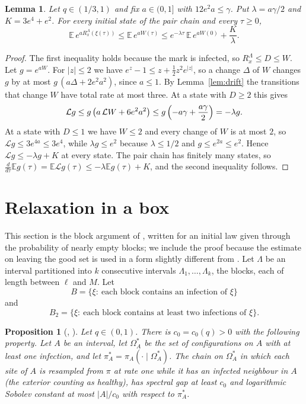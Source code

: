 \documentclass[11pt]{amsart}
\newtheorem{lemma}[theorem]{Lemma}
\newtheorem{proposition}[theorem]{Proposition}
\theoremstyle{definition}
\theoremstyle{remark}
\newcommand{\E}{\mathbb{E}}
\newcommand{\cL}{\mathcal{L}}
\begin{document}
\begin{lemma}\label{lem:moment}
Let $q\in(1/3,1)$ and fix $a\in(0,1]$ with $12e^2a\le\gamma$. Put $\lambda=a\gamma/2$ and $K=3e^4+e^2$. For every
initial state of the pair chain and every $\tau\ge0$,
\begin{equation}\label{eq:moment}
\E\,e^{aR^\Lambda_x(\xi(\tau))}\le\E\,e^{aW(\tau)}\le e^{-\lambda\tau}\,\E\,e^{aW(0)}+\frac K\lambda .
\end{equation}
\end{lemma}

\begin{proof}
The first inequality holds because the mark is infected, so $R^\Lambda_x\le D\le W$. Let $g=e^{aW}$. For $|z|\le2$ we have
$e^z-1\le z+\tfrac12z^2e^{|z|}$, so a change $\Delta$ of $W$ changes $g$ by at most $g\,(a\Delta+2e^2a^2)$, since $a\le1$.
By Lemma~\ref{lem:drift} the transitions that change $W$ have total rate at most three. At a state with $D\ge2$ this gives
\[
\cL g\le g\,\bigl(a\,\cL W+6e^2a^2\bigr)\le g\,\Bigl(-a\gamma+\frac{a\gamma}2\Bigr)=-\lambda g.
\]
At a state with $D\le1$ we have $W\le2$ and every change of $W$ is at most $2$, so $\cL g\le3e^{4a}\le3e^4$, while
$\lambda g\le e^2$ because $\lambda\le1/2$ and $g\le e^{2a}\le e^2$. Hence $\cL g\le-\lambda g+K$ at every state. The pair chain has finitely many
states, so $\frac{d}{d\tau}\E g(\tau)=\E\cL g(\tau)\le-\lambda\E g(\tau)+K$, and the second inequality follows.
\end{proof}

\section{Relaxation in a box}\label{sec:box}

This section is the block argument of \cite[Section~3]{BCMRT13}, written for an initial law given through the probability
of nearly empty blocks; we include the proof because the estimate on leaving the good set is used in a form slightly
different from \cite[Proposition~3.1]{BCMRT13}. Let $\Lambda$ be an interval partitioned into $k$ consecutive intervals
$\Lambda_1,\dots,\Lambda_k$, the blocks, each of length between $\ell$ and $M$. Let
\[
B=\{\xi:\ \text{each block contains an infection of }\xi\}
\]
and
\[
B_2=\{\xi:\ \text{each block contains at least two infections of }\xi\}.
\]

\begin{proposition}[{\cite[Proposition~3.4]{BCMRT13}, \cite[Theorem~6.4]{CMRT09}}]\label{prop:gap}
Let $q\in(0,1)$. There is $c_0=c_0(q)>0$ with the following property. Let $A$ be an interval, let $\Omega_A^*$ be the set
of configurations on $A$ with at least one infection, and let $\pi_A^*=\pi_A(\cdot\mid\Omega_A^*)$. The chain on
$\Omega_A^*$ in which each site of $A$ is resampled from $\pi$ at rate one while it has an infected neighbour in $A$ (the
exterior counting as healthy), has spectral gap at least $c_0$ and logarithmic Sobolev constant at most $|A|/c_0$ with
respect to $\pi_A^*$.
\end{proposition}
\end{document}

